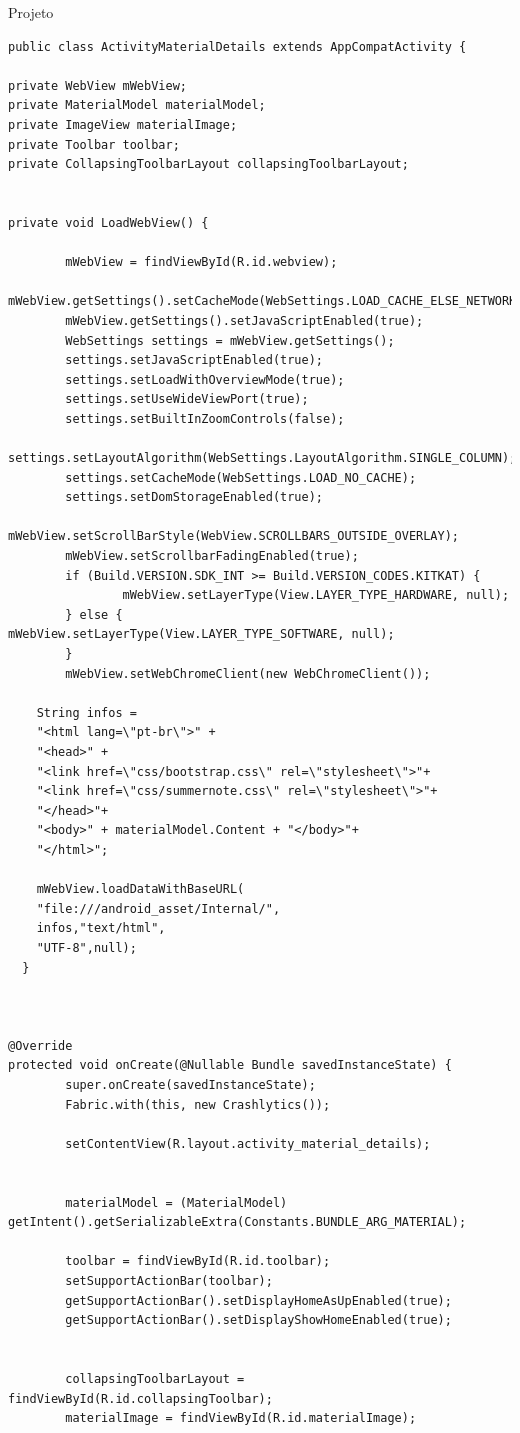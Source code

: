 \documentclass[
	12pt,				%
	openright,			%
	twoside,			%
	a4paper,			%
	english,			%
	french,				%
	spanish,			%
	brazil				%
	]{abntex2}
\begin{document}
\begin{chapter}{Projeto}
\begin{lstlisting}[numbers=none,basicstyle=\small,
caption={ActivityMaterialDetails.java},
title={ActivityMaterialDetails.java},
label={ActivityMaterialDetails.java}]
public class ActivityMaterialDetails extends AppCompatActivity {

private WebView mWebView;
private MaterialModel materialModel;
private ImageView materialImage;
private Toolbar toolbar;
private CollapsingToolbarLayout collapsingToolbarLayout;


private void LoadWebView() {

		mWebView = findViewById(R.id.webview);
		mWebView.getSettings().setCacheMode(WebSettings.LOAD_CACHE_ELSE_NETWORK);
		mWebView.getSettings().setJavaScriptEnabled(true);
		WebSettings settings = mWebView.getSettings();
		settings.setJavaScriptEnabled(true);
		settings.setLoadWithOverviewMode(true);
		settings.setUseWideViewPort(true);
		settings.setBuiltInZoomControls(false);
		settings.setLayoutAlgorithm(WebSettings.LayoutAlgorithm.SINGLE_COLUMN);
		settings.setCacheMode(WebSettings.LOAD_NO_CACHE);
		settings.setDomStorageEnabled(true);
		mWebView.setScrollBarStyle(WebView.SCROLLBARS_OUTSIDE_OVERLAY);
		mWebView.setScrollbarFadingEnabled(true);
		if (Build.VERSION.SDK_INT >= Build.VERSION_CODES.KITKAT) {
				mWebView.setLayerType(View.LAYER_TYPE_HARDWARE, null);
		} else {				mWebView.setLayerType(View.LAYER_TYPE_SOFTWARE, null);
		}
		mWebView.setWebChromeClient(new WebChromeClient());

    String infos =
    "<html lang=\"pt-br\">" +
    "<head>" +
    "<link href=\"css/bootstrap.css\" rel=\"stylesheet\">"+
    "<link href=\"css/summernote.css\" rel=\"stylesheet\">"+
    "</head>"+
    "<body>" + materialModel.Content + "</body>"+
    "</html>";
			
    mWebView.loadDataWithBaseURL(
    "file:///android_asset/Internal/",
    infos,"text/html",
    "UTF-8",null);
  }
  


@Override
protected void onCreate(@Nullable Bundle savedInstanceState) {
		super.onCreate(savedInstanceState);
		Fabric.with(this, new Crashlytics());

		setContentView(R.layout.activity_material_details);


		materialModel = (MaterialModel) getIntent().getSerializableExtra(Constants.BUNDLE_ARG_MATERIAL);

		toolbar = findViewById(R.id.toolbar);
		setSupportActionBar(toolbar);
		getSupportActionBar().setDisplayHomeAsUpEnabled(true);
		getSupportActionBar().setDisplayShowHomeEnabled(true);


		collapsingToolbarLayout = findViewById(R.id.collapsingToolbar);
		materialImage = findViewById(R.id.materialImage);


\end{lstlisting}
\end{chapter}
\end{document}

